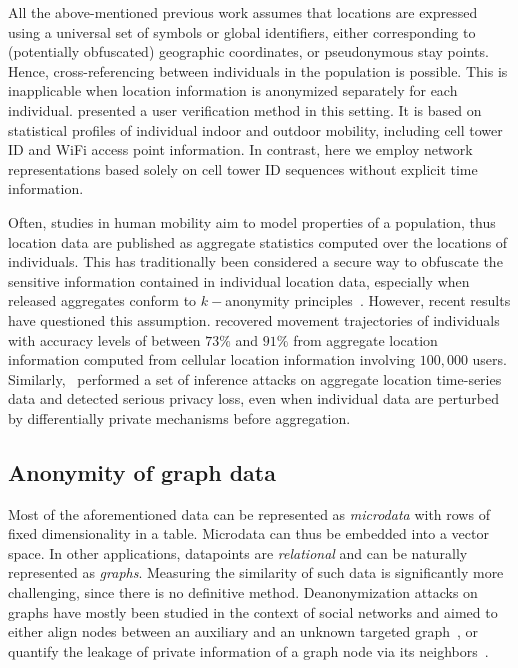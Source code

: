 All the above-mentioned previous work assumes that locations are expressed using a universal set of symbols or global identifiers, either corresponding to (potentially obfuscated) geographic coordinates, or pseudonymous stay points.
Hence, cross-referencing between individuals in the population is possible.
This is inapplicable when location information is anonymized separately for each individual.
 presented a user verification method in this setting.
It is based on statistical profiles of individual indoor and outdoor mobility, including cell tower ID and WiFi access point information.
In contrast, here we employ network representations based solely on cell tower ID sequences without explicit time information.

Often, studies in human mobility aim to model properties of a population, thus location data are published as aggregate statistics computed over the locations of individuals.
This has traditionally been considered a secure way to obfuscate the sensitive information contained in individual location data, especially when released aggregates conform to $ k-$anonymity principles~\citep{sweeney2002k}.
However, recent results have questioned this assumption.
 recovered movement trajectories of individuals with accuracy levels of between $73\%$ and $91\%$ from aggregate location information computed from cellular location information involving $100,000$ users. Similarly,~ performed a set of inference attacks on aggregate location time-series data and detected serious privacy loss, even when individual data are perturbed by differentially private mechanisms before aggregation.

\subsection{Anonymity of graph data }
Most of the aforementioned data can be represented as \emph{microdata} with rows of fixed dimensionality in a table.
Microdata can thus be embedded into a vector space.
In other applications, datapoints are \emph{relational} and can be naturally represented as \emph{graphs}.
Measuring the similarity of such data is significantly more challenging, since there is no definitive method.
Deanonymization attacks on graphs have mostly been studied in the context of social networks and aimed to either align nodes between an auxiliary and an unknown targeted graph~\citep{narayanan2009anonymizing, sharad2014}, or quantify the leakage of private information of a graph node via its neighbors~\citep{zheleva09}.

